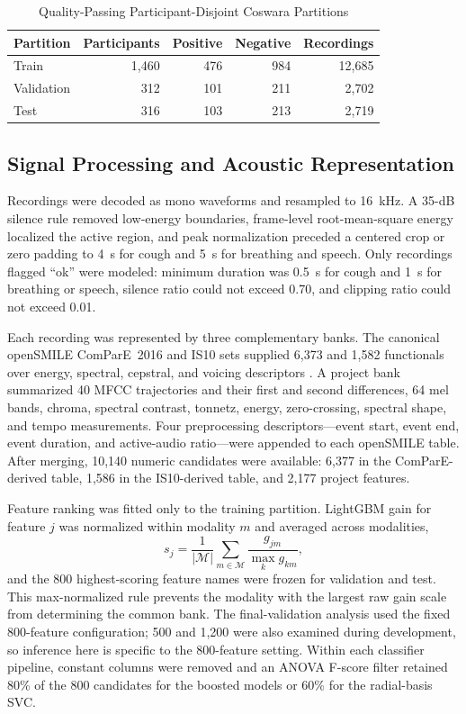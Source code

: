 \documentclass[conference]{IEEEtran}
\begin{document}
\begin{table}[!b]
\caption{Quality-Passing Participant-Disjoint Coswara Partitions}
\label{tab:cohort}
\centering
\footnotesize
\begin{tabular}{lrrrr}
\toprule
Partition & Participants & Positive & Negative & Recordings \\
\midrule
Train      & 1,460 & 476 & 984 & 12,685 \\
Validation &   312 & 101 & 211 &  2,702 \\
Test       &   316 & 103 & 213 &  2,719 \\
\bottomrule
\end{tabular}
\end{table}

\subsection{Signal Processing and Acoustic Representation}

Recordings were decoded as mono waveforms and resampled to 16~kHz. A 35-dB
silence rule removed low-energy boundaries, frame-level root-mean-square
energy localized the active region, and peak normalization preceded a centered
crop or zero padding to 4~s for cough and 5~s for breathing and speech.
Only recordings flagged ``ok'' were modeled: minimum duration was 0.5~s for
cough and 1~s for breathing or speech, silence ratio could not exceed 0.70,
and clipping ratio could not exceed 0.01.

Each recording was represented by three complementary banks. The canonical
openSMILE ComParE~2016 and IS10 sets supplied 6,373 and 1,582 functionals over
energy, spectral, cepstral, and voicing descriptors
\cite{eyben2010opensmile,schuller2010is10,schuller2016compare}. A project bank
summarized 40 MFCC trajectories and their first and second differences, 64 mel
bands, chroma, spectral contrast, tonnetz, energy, zero-crossing, spectral
shape, and tempo measurements. Four preprocessing descriptors---event start,
event end, event duration, and active-audio ratio---were appended to each
openSMILE table. After merging, 10,140 numeric candidates were available:
6,377 in the ComParE-derived table, 1,586 in the IS10-derived table, and 2,177
project features.

Feature ranking was fitted only to the training partition. LightGBM gain for
feature $j$ was normalized within modality $m$ and averaged across modalities,
\begin{equation}
s_j=\frac{1}{|\mathcal{M}|}\sum_{m\in\mathcal{M}}
\frac{g_{jm}}{\max_k g_{km}},
\end{equation}
and the 800 highest-scoring feature names were frozen for validation and test.
This max-normalized rule prevents the modality with the largest raw gain scale
from determining the common bank. The final-validation analysis used the fixed
800-feature configuration; 500 and 1,200 were also examined during development,
so inference here is specific to the 800-feature setting. Within each classifier pipeline,
constant columns were removed and an ANOVA F-score filter retained 80\% of the
800 candidates for the boosted models or 60\% for the radial-basis SVC.
\end{document}
